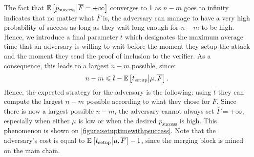 The fact that \(\mathbb{E}\left[p_{\text{success}}\middle|\overline{F}=+\infty\right]\) converges to 1 as \(n - m\) goes to infinity indicates that no matter what \(\overline{F}\) is, the adversary can manage to have a very high probability of success as long as they wait long enough for \(n - m\) to be high. Hence, we introduce a final parameter \(\overline{t}\) which designates the maximum average time that an adversary is willing to wait before the moment they setup the attack and the moment they send the proof of inclusion to the verifier. As a consequence, this leads to a largest \(n - m\) possible, since:
\[n - m\leqslant\overline{t}-\mathbb{E}\left[t_{\text{setup}}\middle|\mu, \overline{F}\right].\]
Hence, the expected strategy for the adversary is the following: using \(\overline{t}\) they can compute the largest \(n - m\) possible according to what they chose for \(\overline{F}\). Since there is now a largest possible \(n - m\), the adversary cannot always set \(\overline{F}=+\infty\), especially when either \(\mu\) is low or when the desired \(p_{\text{success}}\) is high. This phenomenon is shown on \autoref{figure:setuptimewithpsuccess}. Note that the adversary's cost is equal to \(\mathbb{E}\left[t_{\text{setup}}\middle|\mu,\overline{F}\right] - 1\), since the merging block is mined on the main chain.


